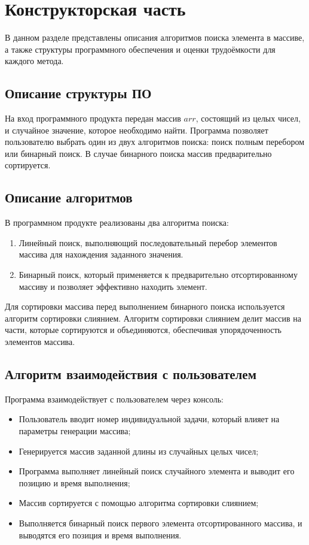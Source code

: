 \documentclass[a4paper, 12pt]{extreport}
\begin{document}
\chapter{Конструкторская часть}

В данном разделе представлены описания алгоритмов поиска элемента в массиве, а также структуры программного обеспечения и оценки трудоёмкости для каждого метода.

\section{Описание структуры ПО}

На вход программного продукта передан массив $arr$, состоящий из целых чисел, и случайное значение, которое необходимо найти. Программа позволяет пользователю выбрать один из двух алгоритмов поиска: поиск полным перебором или бинарный поиск. В случае бинарного поиска массив предварительно сортируется.

\section{Описание алгоритмов}

В программном продукте реализованы два алгоритма поиска:
\begin{enumerate}
    \item[--] Линейный поиск, выполняющий последовательный перебор элементов массива для нахождения заданного значения.
    \item[--] Бинарный поиск, который применяется к предварительно отсортированному массиву и позволяет эффективно находить элемент.
\end{enumerate}

Для сортировки массива перед выполнением бинарного поиска используется алгоритм сортировки слиянием. Алгоритм сортировки слиянием делит массив на части, которые сортируются и объединяются, обеспечивая упорядоченность элементов массива.

\section{Алгоритм взаимодействия с пользователем}

Программа взаимодействует с пользователем через консоль:
\begin{itemize}
    \item[--] Пользователь вводит номер индивидуальной задачи, который влияет на параметры генерации массива;
    \item[--] Генерируется массив заданной длины из случайных целых чисел;
    \item[--] Программа выполняет линейный поиск случайного элемента и выводит его позицию и время выполнения;
    \item[--] Массив сортируется с помощью алгоритма сортировки слиянием;
    \item[--] Выполняется бинарный поиск первого элемента отсортированного массива, и выводятся его позиция и время выполнения.
\end{itemize}
\end{document}

